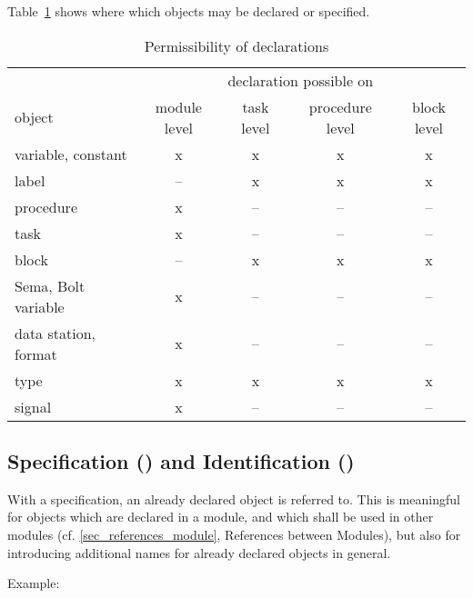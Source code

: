 Table~\ref{objekte} shows where which objects may be declared or
specified.

\begin{table}
\caption{Permissibility of declarations\label{objekte}}
\vspace{5mm}

\begin{tabular}{|l|c|c|c|c|}
\hline
                       & \multicolumn{4}{|c|}{declaration possible on} \\
object                 & module level & task level & procedure level & block level \\ \hline
variable, constant     & x            & x    & x         & x  \\
label                  & --           & x    & x         & x  \\
procedure              & x            & --    & --         & -- \\
task                   & x            & --   & --        & -- \\
block                  & --           & x    & x         & x  \\
Sema, Bolt variable    & x            & --   & --        & -- \\
data station, format   & x            & --   & --        & -- \\
type                   & x            & x    & x         & x \\
signal                 & x            & --   & --        & -- \\ 
\hline
\end{tabular}
\end{table}

\subsection{Specification () and Identification ()}  %
\label{sec_spc}

With a specification, an already declared object is
referred to.  This is meaningful for objects which are declared in a
module, and which shall be used in other modules (cf. \ref{sec_references_module},
 References
between Modules), but also for introducing additional names for already
declared objects in general.

Example:

